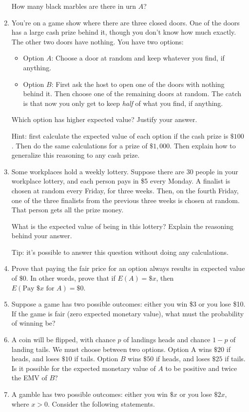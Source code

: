 \documentclass[justified]{tufte-book}
\providecommand{\tightlist}{%
  \setlength{\itemsep}{0pt}\setlength{\parskip}{0pt}}
\theoremstyle{definition}
\theoremstyle{definition}
\theoremstyle{definition}
\theoremstyle{definition}
\theoremstyle{remark}
\begin{document}
\begin{enumerate}
  How many black marbles are there in urn \(A\)?
\item
  You're on a game show where there are three closed doors. One of the doors has a large cash prize behind it, though you don't know how much exactly. The other two doors have nothing. You have two options:

  \begin{itemize}
  \tightlist
  \item
    Option \(A\): Choose a door at random and keep whatever you find, if anything.
  \item
    Option \(B\): First ask the host to open one of the doors with nothing behind it. Then choose one of the remaining doors at random. The catch is that now you only get to keep \emph{half} of what you find, if anything.
  \end{itemize}

  Which option has higher expected value? Justify your answer.

  Hint: first calculate the expected value of each option if the cash prize is \(\$100\). Then do the same calculations for a prize of \(\$1,000\). Then explain how to generalize this reasoning to any cash prize.
\item
  Some workplaces hold a weekly lottery. Suppose there are 30 people in your workplace lottery, and each person pays in \$5 every Monday. A finalist is chosen at random every Friday, for three weeks. Then, on the fourth Friday, one of the three finalists from the previous three weeks is chosen at random. That person gets all the prize money.

  What is the expected value of being in this lottery? Explain the reasoning behind your answer.

  Tip: it's possible to answer this question without doing any calculations.
\item
  Prove that paying the fair price for an option always results in expected value of \(\$0\). In other words, prove that if \(E(A) = \$x\), then \(E(\mbox{Pay } \$x \mbox{ for } A) = \$0\).
\item
  Suppose a game has two possible outcomes: either you win \$3 or you lose \$10. If the game is fair (zero expected monetary value), what must the probability of winning be?
\item
  A coin will be flipped, with chance \(p\) of landings heads and chance \(1-p\) of landing tails. We must choose between two options. Option A wins \(\$20\) if heads, and loses \(\$10\) if tails. Option \(B\) wins \(\$50\) if heads, and loses \(\$25\) if tails. Is it possible for the expected monetary value of \(A\) to be positive and twice the EMV of \(B\)?
\item
  A gamble has two possible outcomes: either you win \(\$x\) or you lose \(\$2x\), where \(x > 0\). Consider the following statements.


\end{enumerate}
\end{document}
